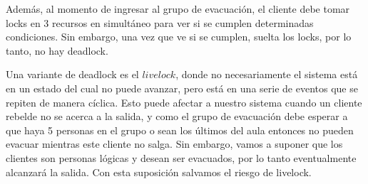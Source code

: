 Además, al momento de ingresar al grupo de evacuación, el cliente debe tomar locks en 3 recursos en simultáneo para ver si se cumplen determinadas condiciones. Sin embargo, una vez que ve si se cumplen, suelta los locks, por lo tanto, no hay deadlock.

Una variante de deadlock es el $livelock$, donde no necesariamente el sistema está en un estado del cual no puede avanzar, pero está en una serie de eventos que se repiten de manera cíclica. Esto puede afectar a nuestro sistema cuando un cliente rebelde no se acerca a la salida, y como el grupo de evacuación debe esperar a que haya 5 personas en el grupo o sean los últimos del aula entonces no pueden evacuar mientras este cliente no salga. Sin embargo, vamos a suponer que los clientes son personas lógicas y desean ser evacuados, por lo tanto eventualmente alcanzará la salida. Con esta suposición salvamos el riesgo de livelock.